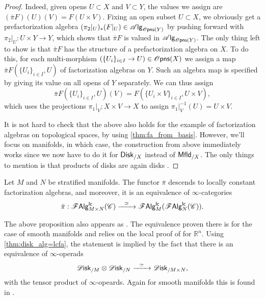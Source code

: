 \documentclass[../text]{subfiles}
\begin{document}
\begin{proof}
    Indeed, given opens $U \subset X$ and $V \subset Y$, the values we assign are $(\bar{\pi}F) (U)(V) = F(U \times V)$. Fixing an open subset $U \subset X$, we obviously get a prefactorization algebra $(\pi_2|_U)_* (F|_U) \in \alg{\opens(Y)}$ by pushing forward with $\pi_2|_U: U \times Y \rightarrow Y$, which shows that $\bar{\pi}F$ is valued in $\alg{\opens(Y)}$. The only thing left to show is that $\bar{\pi} F$ has the structure of a prefactorization algebra on $X$. To do this, for each multi-morphism $(\{ U_i \}_{i \in I} \rightarrow U) \in \opens(X)$ we assign a map $\bar{\pi}F (\{ U_i \}_{i \in I}, U)$ of factorization algebras on $Y$. Such an algebra map is specified by giving its value on all opens of $Y$ separately. We can thus assign
    \begin{equation}
        \bar{\pi}F (\{ U_i \}_{i \in I}, U)(V) = F(\{ U_i \times V \}_{i \in I}, U \times V),
    \end{equation}
    which uses the projections $\pi_1|_V : X \times V \rightarrow X$ to assign $\pi_1|_V^{-1}(U) = U \times V$.

    It is not hard to check that the above also holds for the example of factorization algebras on topological spaces, by using \cref{thm:fa_from_basis}. However, we'll focus on manifolds, in which case, the construction from above immediately works since we now have to do it for $\disk[r]_{/X}$ instead of $\mfld[r]_{/X}$. The only things to mention is that products of disks are again disks \cite[cor.3.4.9]{aft_localstrut}.
\end{proof}


\begin{proposition}\label{prop:exp_of_products_lc}
    Let $M$ and $N$ be stratified manifolds. The functor $\bar{\pi}$ descends to locally constant factorization algebras, and moreover, it is an equivalence of $\infty$-categories
    \begin{equation}
        \bar{\pi}: \mathscr{F} \mathsf{Alg}^{\mathsf{lc}}_{M \times N}(\mathscr{C}) \xrightarrow{\ \ \simeq \ \ } \mathscr{F} \mathsf{Alg}^{\mathsf{lc}}_{M}(\mathscr{F} \mathsf{Alg}^{\mathsf{lc}}_{N}(\mathscr{C})).
    \end{equation}
\end{proposition}

\begin{remark}
    The above proposition also appears as \cite[prop.18]{ginot2015}. The equivalence proven there is for the case of smooth manifolds and relies on the local proof of \cite{lurie_ha} for $\mathbb{R}^n$. Using \cref{thm:disk_alg=lcfa}, the statement is implied by the fact that there is an equivalence of $\infty$-operads
    \begin{equation}
        \disk_{/M} \otimes \disk_{/N} \xrightarrow{\ \ \simeq \ \ } \disk_{/M \times N},
    \end{equation}
    with the tensor product of $\infty$-opeards. Again for smooth manifolds this is found in \cite[ex.5.4.5.5]{lurie_ha}.
\end{remark}
\end{document}
